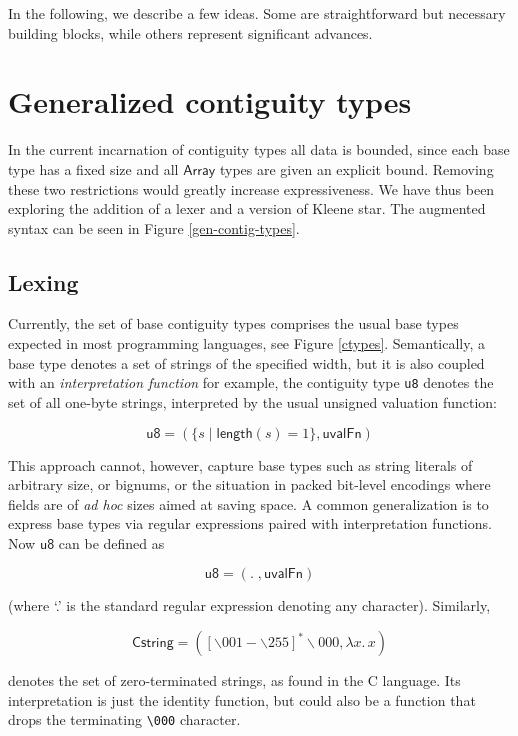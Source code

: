 \documentclass{article}
\newcommand{\konst}[1]{\ensuremath{\mathsf{#1}}}
\newcommand{\set}[1]{\ensuremath{\{ {#1} \}}}
\theoremstyle{definition}
\begin{document}
In the following, we describe a few ideas. Some are straightforward
but necessary building blocks, while others represent significant
advances.

\section{Generalized contiguity types}

In the current incarnation of contiguity types all data is bounded,
since each base type has a fixed size and all \konst{Array} types are
given an explicit bound. Removing these two restrictions would
greatly increase expressiveness. We have thus been exploring the
addition of a lexer and a version of Kleene star. The augmented syntax
can be seen in Figure \ref{gen-contig-types}.

\subsection{Lexing}

Currently, the set of base contiguity types comprises the usual base
types expected in most programming languages, see Figure
\ref{ctypes}. Semantically, a base type denotes a set of strings of
the specified width, but it is also coupled with an
\emph{interpretation function} for example, the contiguity type
\verb+u8+ denotes the set of all one-byte strings, interpreted by the
usual unsigned valuation function:

  \[ \konst{u8} = (\set{s \mid \konst{length}(s) = 1}, \konst{uvalFn} )
  \]

  This approach cannot, however, capture base types such as string
  literals of arbitrary size, or bignums, or the situation in packed
  bit-level encodings where fields are of \emph{ad hoc} sizes aimed at
  saving space. A common generalization is to express base types via
  regular expressions paired with interpretation functions. Now
  \konst{u8} can be defined as

  \[ \konst{u8} = ( . \; , \konst{uvalFn})
  \]

\noindent (where `.' is the standard regular expression denoting any character). Similarly,

  \[ \konst{Cstring} = ([\backslash 001-\backslash 255]^{*}\backslash 000, \lambda x.\,x )
  \]

\noindent denotes the set of zero-terminated strings, as found in the
C language. Its interpretation is just the identity function, but
could also be a function that drops the terminating \verb+\000+
character.
\end{document}
